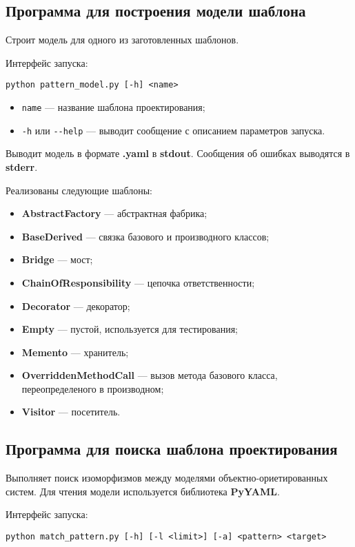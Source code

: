 \subsection{Программа для построения модели шаблона}

Строит модель для одного из заготовленных шаблонов.

Интерфейс запуска:
\begin{verbatim}
python pattern_model.py [-h] <name>
\end{verbatim}

\begin{itemize}
\item \verb;name; --- название шаблона проектирования;
\item \verb;-h; или \verb;--help; --- выводит сообщение с описанием параметров
запуска.
\end{itemize}

Выводит модель в формате \textbf{.yaml} в \textbf{stdout}.
Сообщения об ошибках выводятся в \textbf{stderr}.

Реализованы следующие шаблоны:
\begin{itemize}
\item \textbf{AbstractFactory} --- абстрактная фабрика;
\item \textbf{BaseDerived} --- связка базового и производного классов;
\item \textbf{Bridge} --- мост;
\item \textbf{ChainOfResponsibility} --- цепочка ответственности;
\item \textbf{Decorator} --- декоратор;
\item \textbf{Empty} --- пустой, используется для тестирования;
\item \textbf{Memento} --- хранитель;
\item \textbf{OverriddenMethodCall} --- вызов метода базового класса,
переопределеного в производном;
\item \textbf{Visitor} --- посетитель.
\end{itemize}

\subsection{Программа для поиска шаблона проектирования}

Выполняет поиск изоморфизмов между моделями объектно-ориетированных систем.
Для чтения модели используется библиотека \textbf{PyYAML}.

Интерфейс запуска:
\begin{verbatim}
python match_pattern.py [-h] [-l <limit>] [-a] <pattern> <target>
\end{verbatim}

